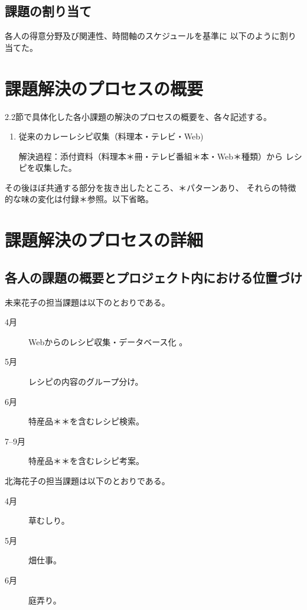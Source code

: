 \documentclass[openany,11pt,papersize]{jsbook}
\begin{document}

\section{課題の割り当て}

各人の得意分野及び関連性、時間軸のスケジュールを基準に
以下のように割り当てた。


\chapter{課題解決のプロセスの概要}
2.2節で具体化した各小課題の解決のプロセスの概要を、各々記述する。

\begin{enumerate}
 \item 従来のカレーレシピ収集（料理本・テレビ・Web) 
\par 解決過程：添付資料（料理本＊冊・テレビ番組＊本・Web＊種類）から
     レシピを収集した。 
\end{enumerate}


その後ほぼ共通する部分を抜き出したところ、＊パターンあり、
それらの特徴的な味の変化は付録＊参照。以下省略。




\chapter{課題解決のプロセスの詳細}

\section{各人の課題の概要とプロジェクト内における位置づけ}

未来花子の担当課題は以下のとおりである。 
\begin{description}
 \item[4月] Webからのレシピ収集・データベース化 。
 \item[5月] レシピの内容のグループ分け。
 \item[6月] 特産品＊＊を含むレシピ検索。
 \item[7--9月]特産品＊＊を含むレシピ考案。
\end{description}

北海花子の担当課題は以下のとおりである。 
\begin{description}
 \item[4月] 草むしり。
 \item[5月] 畑仕事。
 \item[6月] 庭弄り。
\end{description}
\end{document}
